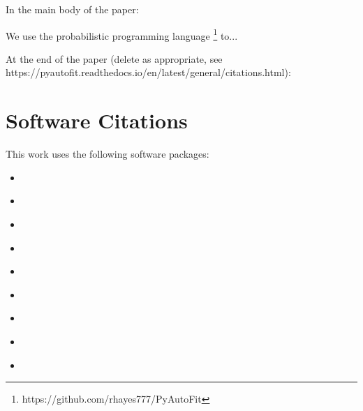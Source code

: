 In the main body of the paper:

We use the probabilistic programming language \footnote{https://github.com/rhayes777/PyAutoFit} \citep{pyautofit} to...

At the end of the paper (delete as appropriate, see https://pyautofit.readthedocs.io/en/latest/general/citations.html):

\section*{Software Citations}

This work uses the following software packages:

\begin{itemize}

\item
\href{https://github.com/dfm/corner.py}{}
\citep{corner}

\item
\href{https://github.com/joshspeagle/dynesty}{}
\citep{dynesty}

\item
\href{https://github.com/dfm/emcee}{}
\citep{emcee}

\item
\href{https://github.com/matplotlib/matplotlib}{}
\citep{matplotlib}

\item
\href{https://github.com/numpy/numpy}{}
\citep{numpy}

\item
\href{https://github.com/JohannesBuchner/PyMultiNest}{}
\citep{multinest, pymultinest}

\item
\href{https://github.com/ljvmiranda921/pyswarms}{}
\citep{pyswarms}

\item
\href{https://www.python.org/}{}
\citep{python}

\item
\href{https://github.com/scipy/scipy}{}
\citep{scipy}

\end{itemize}